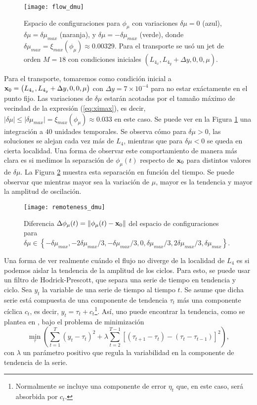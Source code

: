 \begin{figure}
 \centering
 \texttt{[image: flow\_dmu]}
 \caption{Espacio de configuraciones para $\phi_\mu$ con variaciones $\delta\mu = 0$ (azul), $\delta\mu = \delta\mu_{max}$ (naranja), y $\delta\mu = -\delta\mu_{max}$ (verde), donde $\delta\mu_{max} = \xi_{max}(\phi_\mu) \approx 0.00329$. Para el transporte se usó un jet de orden $M=18$ con condiciones iniciales $\left( L_{4_x}, L_{4_y} + \Delta y, 0, 0, \mu \right)$.}
 \label{fig:flow_dmu}
\end{figure}

Para el transporte, tomaremos como condición inicial a $\mathbf{x}_0 = \left( L_{4_x}, L_{4_y} + \Delta y, 0, 0, \mu \right)$ con $\Delta y = 7\times 10^{-4}$ para no estar exáctamente en el punto fijo. Las variaciones de $\delta\mu$ estarán acotadas por el tamaño máximo de vecindad de la expresión (\ref{eq:ximax}), es decir, $\lvert \delta\mu \rvert \leq \lvert \delta\mu_{max} \rvert = \xi_{max}(\phi_\mu) \approx 0.033$ en este caso. Se puede ver en la Figura \ref{fig:flow_dmu} una integración a $40$ unidades temporales. Se observa cómo para $\delta \mu > 0$, las soluciones se alejan cada vez más de $L_4$, mientras que para $\delta \mu < 0$ se queda en cierta localidad. Una forma de observar este comportamiento de manera más clara es si medimos la separación de $\phi_\mu(t)$ respecto de $\mathbf{x}_0$ para distintos valores de $\delta \mu$. La Figura \ref{fig:remoteness_dmu} muestra esta separación en función del tiempo. Se puede observar que mientras mayor sea la variación de $\mu$, mayor es la tendencia y mayor la amplitud de oscilación. 

\begin{figure}
 \centering
 \texttt{[image: remoteness\_dmu]}
 \caption{Diferencia $\Delta\phi_\mu(t) = \left\lVert \phi_\mu(t) - \mathbf{x}_0 \right\rVert$ del espacio de configuraciones para $\delta\mu \in \left\lbrace -\delta\mu_{max}, -2\delta\mu_{max}/3, -\delta\mu_{max}/3, 0, \delta\mu_{max}/3, 2\delta\mu_{max}/3, \delta\mu_{max}  \right\rbrace$.}
 \label{fig:remoteness_dmu}
\end{figure}

Una forma de ver realmente cuándo el flujo no diverge de la localidad de $L_4$ es si podemos aislar la tendencia de la amplitud de los ciclos. Para esto, se puede usar un filtro de Hodrick-Prescott, que separa una serie de tiempo en tendencia y ciclo. Sea $y_t$ la variable de una serie de tiempo al tiempo $t$. Se asume que dicha serie está compuesta de una componente de tendencia $\tau_t$ más una componente cíclica $c_t$, es decir, $y_t = \tau_t + c_t$\footnote{Normalmente se incluye una componente de error $\eta_t$ que, en este caso, será absorbida por $c_t$.}. Así, uno puede encontrar la tendencia, como se plantea en \cite{Hodrick1997}, bajo el problema de minimización
\begin{equation}
 \min_{\tau} \left( \sum_{t=1}^T (y_t - \tau_t)^2 + \lambda \sum_{t=2}^{T-1} \left[ (\tau_{t+1} - \tau_t) - (\tau_t - \tau_{t-1}) \right]^2 \right),
 \label{eq:hp-filter}
\end{equation} 
con $\lambda$ un parámetro positivo que regula la variabilidad en la componente de tendencia de la serie.

